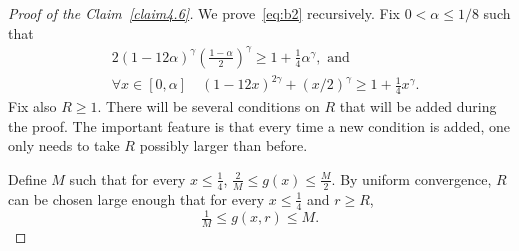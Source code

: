 \documentclass[AHL,Unicode,longabstracts]{cedram}
\let\oldforall\forall
\renewcommand*{\forall}{\mathrel{\oldforall}}
\begin{document}
\begin{proof}[{Proof of the Claim~\ref{claim4.6}}]
We prove~\eqref{eq:b2} recursively. Fix $0< \alpha\le 1/8$ such that
\begin{align}
&2 (1-12\alpha)^\gamma \left(\tfrac{1-\alpha}2\right)^\gamma\ge 1+\tfrac14 \alpha^\gamma,\text{ and} \label{eq:9}
\\\label{eq:10}
&\forall x\in[0,\alpha] \quad (1 - 12x)^{2\gamma}+(x/2)^\gamma
\ge 1+\tfrac14 x^\gamma.
\end{align}
Fix also $R\ge1$. There will be several conditions on $R$ that will be added during the proof. The important feature is that every time a new condition is added, one only needs to take $R$ possibly larger than before.

Define $M$ such that for every $x\le \tfrac14$, $\tfrac2M\le g(x)\le\tfrac M2$. By uniform convergence, $R$ can be chosen large enough that for every $x\le \tfrac14$ and $r\ge R$,
\begin{equation}
\tfrac1M\le g(x,r)\le M.\label{eq:b1}
\end{equation}


\end{proof}
\end{document}
